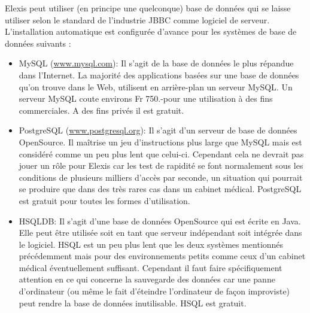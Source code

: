 Elexis peut utiliser (en principe une quelconque) base de données qui se laisse utiliser selon le standard de l'industrie JBBC comme logiciel de serveur. L'installation automatique est configurée d'avance pour les systèmes de base de données suivants :
\begin{itemize}
\item MySQL (\href{http://www.mysql.com}{www.mysql.com}): Il s'agit de la base de données le plus répandue dans l'Internet. La majorité des applications basées sur une base de données qu'on trouve dans le Web, utilisent en arrière-plan un serveur MySQL. Un serveur MySQL coute environs Fr 750.-pour une utilisation à des fins commerciales. A des fins privés il est gratuit.

\item PostgreSQL (\href{http://www.postgresql.org}{www.postgresql.org}): Il s'agit d'un serveur de base de données OpenSource. Il maîtrise un jeu d'instructions plus large que MySQL mais est considéré comme un peu plus lent que celui-ci. Cependant cela ne devrait pas jouer un rôle pour Elexis car les test de rapidité se font normalement sous les conditions de plusieurs milliers d'accès par seconde, un situation qui pourrait se produire que dans des très rares cas dans un cabinet médical. PostgreSQL est gratuit pour toutes les formes d'utilisation.

\item HSQLDB: Il s'agit d'une base de données OpenSource qui est écrite en Java. Elle peut être utilisée soit en tant que serveur indépendant soit intégrée dans le logiciel. HSQL est un peu plus lent que les deux systèmes mentionnés précédemment mais pour des environnements petits comme ceux d'un cabinet médical éventuellement suffisant. Cependant il faut faire spécifiquement attention en ce qui concerne la sauvegarde des données car une panne d'ordinateur (ou même le fait d'éteindre l'ordinateur de façon improviste) peut rendre la base de données inutilisable. HSQL est gratuit.
\end{itemize}

